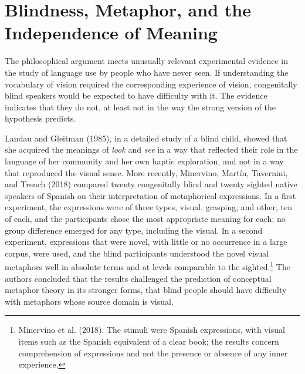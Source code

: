 \documentclass[11pt]{article}
\theoremstyle{remark}
\begin{document}
\section{Blindness, Metaphor, and the Independence of Meaning}

The philosophical argument meets unusually relevant experimental evidence in the study of language use by people who have never seen. If understanding the vocabulary of vision required the corresponding experience of vision, congenitally blind speakers would be expected to have difficulty with it. The evidence indicates that they do not, at least not in the way the strong version of the hypothesis predicts.

Landau and Gleitman (1985), in a detailed study of a blind child, showed that she acquired the meanings of \emph{look} and \emph{see} in a way that reflected their role in the language of her community and her own haptic exploration, and not in a way that reproduced the visual sense. More recently, Minervino, Martín, Tavernini, and Trench (2018) compared twenty congenitally blind and twenty sighted native speakers of Spanish on their interpretation of metaphorical expressions. In a first experiment, the expressions were of three types, visual, grasping, and other, ten of each, and the participants chose the most appropriate meaning for each; no group difference emerged for any type, including the visual. In a second experiment, expressions that were novel, with little or no occurrence in a large corpus, were used, and the blind participants understood the novel visual metaphors well in absolute terms and at levels comparable to the sighted.\footnote{Minervino et al. (2018). The stimuli were Spanish expressions, with visual items such as the Spanish equivalent of a clear book; the results concern comprehension of expressions and not the presence or absence of any inner experience.} The authors concluded that the results challenged the prediction of conceptual metaphor theory in its stronger forms, that blind people should have difficulty with metaphors whose source domain is visual.
\end{document}
